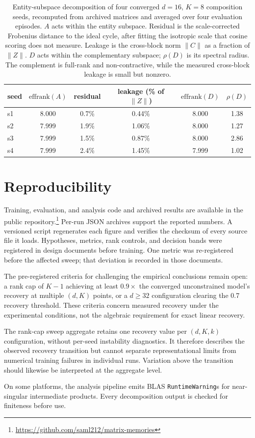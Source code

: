 \begin{table}[H]
\centering
\small
\begin{tabular}{lccccc}
\toprule
seed & $\mathrm{effrank}(A)$ & residual & leakage (\% of $\|Z\|$) & $\mathrm{effrank}(D)$ & $\rho(D)$ \\
\midrule
s1 & 8.000 & 0.7\% & 0.44\% & 8.000 & 1.38 \\
s2 & 7.999 & 1.9\% & 1.06\% & 8.000 & 1.27 \\
s3 & 7.999 & 1.5\% & 0.87\% & 8.000 & 2.86 \\
s4 & 7.999 & 2.4\% & 1.45\% & 7.999 & 1.02 \\
\bottomrule
\end{tabular}
\caption{Entity-subspace decomposition of four converged $d{=}16$, $K{=}8$
composition seeds, recomputed from archived matrices and averaged
over four evaluation episodes. $A$ acts within the entity subspace.
Residual is the scale-corrected Frobenius distance to the ideal cycle,
after fitting the isotropic scale that cosine scoring does not
measure. Leakage is the cross-block norm $\|C\|$ as a fraction of
$\|Z\|$. $D$ acts within the complementary subspace;
$\rho(D)$ is its spectral radius. The complement is full-rank and
non-contractive, while the measured cross-block leakage is small
but nonzero.}
\label{tab:subspace}
\end{table}

\section{Reproducibility}
\label{app:repro}

Training, evaluation, and analysis code and archived results are
available in the public repository.\footnote{\url{https://github.com/saml212/matrix-memories}}
Per-run JSON archives support the reported numbers. A versioned script regenerates each figure
and verifies the checksum of every source file it loads. Hypotheses,
metrics, rank controls, and decision bands were registered in design
documents before training. One metric was re-registered before the
affected sweep; that deviation is recorded in those documents.

The pre-registered criteria for challenging the empirical conclusions
remain open: a rank cap of $K{-}1$ achieving at least
$0.9\times$ the converged unconstrained model's recovery at multiple
$(d, K)$ points, or a $d \geq 32$ configuration clearing the 0.7 recovery
threshold. These criteria concern measured recovery under the
experimental conditions, not the algebraic requirement for exact
linear recovery.

The rank-cap sweep aggregate retains one recovery value per
$(d, K, k)$ configuration, without per-seed instability diagnostics.
It therefore describes the observed recovery transition but cannot
separate representational limits from numerical training failures
in individual runs. Variation above the transition should likewise
be interpreted at the aggregate level.

On some platforms, the analysis pipeline emits BLAS
\texttt{RuntimeWarning}s for near-singular intermediate products.
Every decomposition output is checked for finiteness before use.
